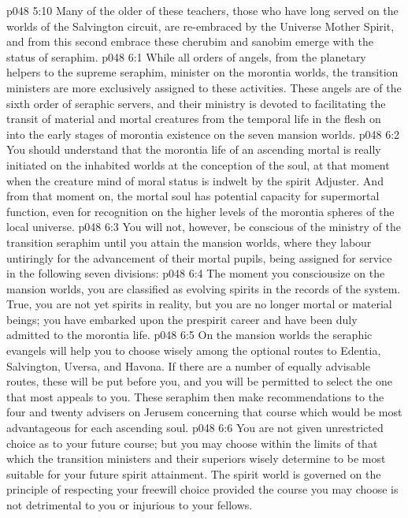 \vs p048 5:10 Many of the older of these teachers, those who have long served on the worlds of the Salvington circuit, are re\hyp{}embraced by the Universe Mother Spirit, and from this second embrace these cherubim and sanobim emerge with the status of seraphim.
\vs p048 6:1 While all orders of angels, from the planetary helpers to the supreme seraphim, minister on the morontia worlds, the transition ministers are more exclusively assigned to these activities. These angels are of the sixth order of seraphic servers, and their ministry is devoted to facilitating the transit of material and mortal creatures from the temporal life in the flesh on into the early stages of morontia existence on the seven mansion worlds.
\vs p048 6:2 You should understand that the morontia life of an ascending mortal is really initiated on the inhabited worlds at the conception of the soul, at that moment when the creature mind of moral status is indwelt by the spirit Adjuster. And from that moment on, the mortal soul has potential capacity for supermortal function, even for recognition on the higher levels of the morontia spheres of the local universe.
\vs p048 6:3 \pc You will not, however, be conscious of the ministry of the transition seraphim until you attain the mansion worlds, where they labour untiringly for the advancement of their mortal pupils, being assigned for service in the following seven divisions:
\vs p048 6:4 \bibnobreakspace {} The moment you consciousize on the mansion worlds, you are classified as evolving spirits in the records of the system. True, you are not yet spirits in reality, but you are no longer mortal or material beings; you have embarked upon the prespirit career and have been duly admitted to the morontia life.
\vs p048 6:5 On the mansion worlds the seraphic evangels will help you to choose wisely among the optional routes to Edentia, Salvington, Uversa, and Havona. If there are a number of equally advisable routes, these will be put before you, and you will be permitted to select the one that most appeals to you. These seraphim then make recommendations to the four and twenty advisers on Jerusem concerning that course which would be most advantageous for each ascending soul.
\vs p048 6:6 You are not given unrestricted choice as to your future course; but you may choose within the limits of that which the transition ministers and their superiors wisely determine to be most suitable for your future spirit attainment. The spirit world is governed on the principle of respecting your freewill choice provided the course you may choose is not detrimental to you or injurious to your fellows.
